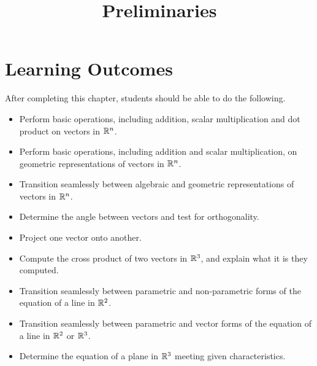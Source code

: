 \documentclass{ximera}
\title{Preliminaries}
\begin{document}
\begin{abstract}
\end{abstract}
 
\maketitle
 
\section*{Learning Outcomes}
After completing this chapter, students should be able to do the following.
 
\begin{itemize}
    \item Perform basic operations, including addition, scalar multiplication and dot product on vectors in $\mathbb{R}^n$.
    
    \item Perform basic operations, including addition and scalar multiplication, on geometric representations of vectors in $\mathbb{R}^n$.
    
    \item Transition seamlessly between algebraic and geometric representations of vectors in $\mathbb{R}^n$.
    
   \item  Determine the angle between vectors and test for orthogonality.

   \item  Project one vector onto another.

   \item  Compute the cross product of two vectors in $\mathbb{R}^3$, and explain what it is they computed.

   \item Transition seamlessly between parametric and non-parametric forms of the equation of a line in $\mathbb{R}^2$.
   
   \item Transition seamlessly between parametric and vector forms of the equation of a line in $\mathbb{R}^2$ or $\mathbb{R}^3$.

   \item  Determine the equation of a plane in $\mathbb{R}^3$ meeting given characteristics.
   
 \end{itemize}
 
\end{document}

